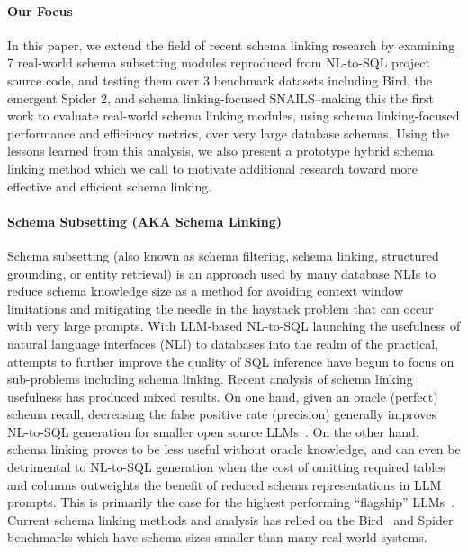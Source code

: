 \paragraph{\textbf{Our Focus}}
In this paper, we extend the field of recent schema linking research by examining 7 real-world schema subsetting modules reproduced from NL-to-SQL project source code, and testing them over 3 benchmark datasets including Bird, the emergent Spider 2, and schema linking-focused SNAILS--making this the first work to evaluate real-world schema linking modules, using schema linking-focused performance and efficiency metrics, over very large database schemas.
Using the lessons learned from this analysis, we also present a prototype hybrid schema linking method which we call \PROJECTNAME{ }to motivate additional research toward more effective and efficient schema linking.

\paragraph{\textbf{Schema Subsetting (AKA Schema Linking)}}

Schema subsetting (also known as schema filtering, schema linking, structured grounding, or entity retrieval) is an approach used by many database NLIs to reduce schema knowledge size as a method for avoiding context window limitations and mitigating the needle in the haystack problem that can occur with very large prompts.
With LLM-based NL-to-SQL launching the usefulness of natural language interfaces (NLI) to databases into the realm of the practical, attempts to further improve the quality of SQL inference have begun to focus on sub-problems including schema linking.
Recent analysis of schema linking usefulness has produced mixed results.
On one hand, given an oracle (perfect) schema recall, decreasing the false positive rate (precision) generally improves NL-to-SQL generation for smaller open source LLMs~\cite{Katsogiannis-Meimarakis2026}.
On the other hand, schema linking proves to be less useful without oracle knowledge, and can even be detrimental to NL-to-SQL generation when the cost of omitting required tables and columns outweights the benefit of reduced schema representations in LLM prompts. 
This is primarily the case for the highest performing ``flagship'' LLMs~\cite{maamari2024deathschemalinkingtexttosql}.
Current schema linking methods and analysis has relied on the Bird~\cite{benchmark-bird} and Spider~\cite{benchmark-spider} benchmarks which have schema sizes smaller than many real-world systems.


